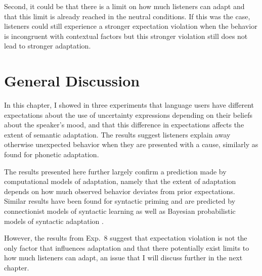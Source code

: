 Second, it could be that there is a limit on how much listeners can adapt and that this limit is already reached in the neutral conditions. If this was the case, listeners could still experience a stronger expectation violation when the behavior is incongruent with contextual factors but this stronger violation still does not lead to stronger adaptation. 


\section{General Discussion}

In this chapter, I showed in three experiments that language users have different expectations about the use of uncertainty expressions depending on their beliefs about the speaker's mood, and that this difference in expectations affects the extent of semantic adaptation. The results suggest listeners explain away otherwise unexpected behavior when they are presented with a cause, similarly as \textcite{Kraljic2008} found for phonetic adaptation.

The results presented here further largely confirm a prediction made by computational models of adaptation, namely that the extent of adaptation depends on how much observed behavior deviates from prior expectations. Similar results have been found for syntactic priming \cite{Jaeger2013} and are predicted by connectionist models of syntactic learning \cite{Chang2006} as well as Bayesian probabilistic models of syntactic adaptation \cite{Kleinschmidt2012}.

However, the results from Exp.~8 suggest that expectation violation is not the only factor that influences adaptation and that there potentially exist limits to how much listeners can adapt, an issue that I will discuss further in the next chapter. 
